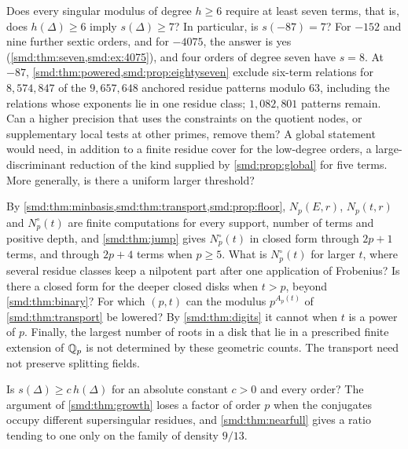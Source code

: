 \begin{question}\label{smd:q:six}
Does every singular modulus of degree $h\ge6$ require at least seven terms, that is, does
$h(\Delta)\ge6$ imply $s(\Delta)\ge7$? In particular, is $s(-87)=7$? For $-152$ and nine
further sextic orders, and for $-4075$, the answer is yes
(\cref{smd:thm:seven,smd:ex:4075}), and four orders of degree seven have $s=8$. At $-87$,
\cref{smd:thm:powered,smd:prop:eightyseven} exclude six-term relations for $8{,}574{,}847$
of the $9{,}657{,}648$ anchored residue patterns modulo $63$, including the relations whose
exponents lie in one residue class; $1{,}082{,}801$ patterns remain. Can a higher precision
that uses the constraints on the quotient nodes, or supplementary local tests at other
primes, remove them? A global statement would need, in addition to a finite
residue cover for the low-degree orders, a large-discriminant reduction of the kind supplied
by \cref{smd:prop:global} for five terms. More generally, is there a uniform larger
threshold?
\end{question}

\begin{question}\label{smd:q:roots}
By \cref{smd:thm:minbasis,smd:thm:transport,smd:prop:floor}, $N_p(E,r)$, $N_p(t,r)$ and
$N^\circ_p(t)$ are finite computations for every support, number of terms and positive depth,
and \cref{smd:thm:jump} gives $N^\circ_p(t)$ in closed form through $2p+1$ terms, and through
$2p+4$ terms when $p\ge5$. What is $N^\circ_p(t)$ for larger $t$, where several residue classes
keep a nilpotent part after one application of Frobenius? Is there a closed form for the deeper
closed disks when $t>p$, beyond \cref{smd:thm:binary}? For which $(p,t)$ can the modulus
$p^{A_p(t)}$ of \cref{smd:thm:transport} be lowered? By \cref{smd:thm:digits} it cannot when $t$
is a power of $p$. Finally, the largest number of roots in a disk that lie in a prescribed
finite extension of $\mathbb{Q}_p$ is not determined by these geometric counts. The transport need not
preserve splitting fields.
\end{question}

\begin{question}\label{smd:q:fraction}
Is $s(\Delta)\ge c\,h(\Delta)$ for an absolute constant $c>0$ and every order? The
argument of \cref{smd:thm:growth} loses a factor of order $p$ when the conjugates occupy
different supersingular residues, and \cref{smd:thm:nearfull} gives a ratio tending to
one only on the family of density $9/13$.
\end{question}

